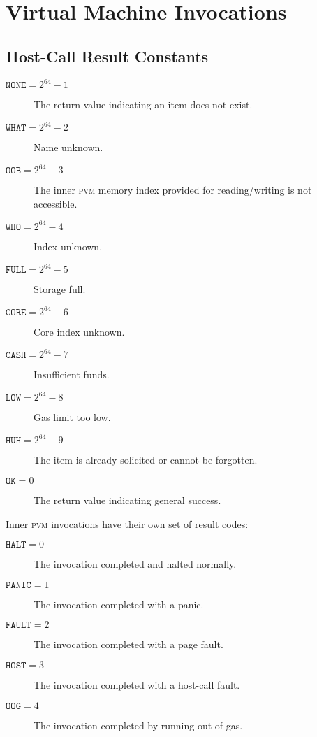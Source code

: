 \section{Virtual Machine Invocations}\label{sec:virtualmachineinvocations}



\newcommand*{\pvm}{\mathbf{M}}
\newcommand*{\segoff}{\varsigma}
\newcommand*{\execst}{\varepsilon}

\subsection{Host-Call Result Constants}

\begin{description}
  \item[$\mathtt{NONE} = 2^{64} - 1$] The return value indicating an item does not exist.
  \item[$\mathtt{WHAT} = 2^{64} - 2$] Name unknown.
  \item[$\mathtt{OOB} = 2^{64} - 3$] The inner \textsc{pvm} memory index provided for reading/writing is not accessible.
  \item[$\mathtt{WHO} = 2^{64} - 4$] Index unknown.
  \item[$\mathtt{FULL} = 2^{64} - 5$] Storage full.
  \item[$\mathtt{CORE} = 2^{64} - 6$] Core index unknown.
  \item[$\mathtt{CASH} = 2^{64} - 7$] Insufficient funds.
  \item[$\mathtt{LOW} = 2^{64} - 8$] Gas limit too low.
  \item[$\mathtt{HUH} = 2^{64} - 9$] The item is already solicited or cannot be forgotten.
  \item[$\mathtt{OK} = 0$] The return value indicating general success.
\end{description}

Inner \textsc{pvm} invocations have their own set of result codes:
\begin{description}
  \item[$\mathtt{HALT} = 0$] The invocation completed and halted normally.
  \item[$\mathtt{PANIC} = 1$] The invocation completed with a panic.
  \item[$\mathtt{FAULT} = 2$] The invocation completed with a page fault.
  \item[$\mathtt{HOST} = 3$] The invocation completed with a host-call fault.
  \item[$\mathtt{OOG} = 4$] The invocation completed by running out of gas.
\end{description}

